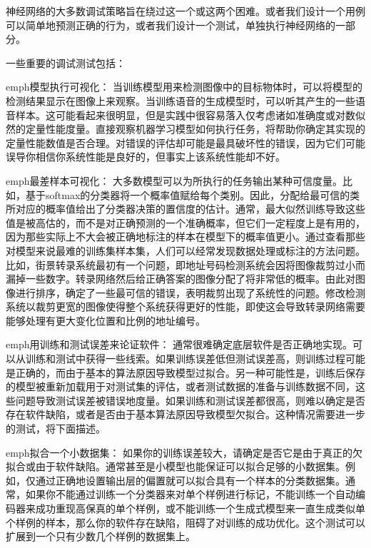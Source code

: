 神经网络的大多数调试策略旨在绕过这一个或这两个困难。或者我们设计一个用例可以简单地预测正确的行为，或者我们设计一个测试，单独执行神经网络的一部分。

一些重要的调试测试包括：

emph{模型执行可视化}：
当训练模型用来检测图像中的目标物体时，可以将模型的检测结果显示在图像上来观察。当训练语音的生成模型时，可以听其产生的一些语音样本。这可能看起来很明显，但是实践中很容易落入仅考虑诸如准确度或对数似然的定量性能度量。直接观察机器学习模型如何执行任务，将帮助你确定其实现的定量性能数值是否合理。对错误的评估却可能是最具破坏性的错误，因为它们可能误导你相信你系统性能是良好的，但事实上该系统性能却不好。

emph{最差样本可视化}：
大多数模型可以为所执行的任务输出某种可信度量。比如，基于softmax的分类器将一个概率值赋给每个类别。因此，分配给最可信的类所对应的概率值给出了分类器决策的置信度的估计。通常，最大似然训练导致这些值是被高估的，而不是对正确预测的一个准确概率，但它们一定程度上是有用的，因为那些实际上不大会被正确地标注的样本在模型下的概率值更小。通过查看那些对模型来说最难的训练集样本集，人们可以经常发现数据处理或标注的方法问题。比如，街景转录系统最初有一个问题，即地址号码检测系统会因将图像裁剪过小而漏掉一些数字。转录网络然后给正确答案的图像分配了将非常低的概率。由此对图像进行排序，确定了一些最可信的错误，表明裁剪出现了系统性的问题。修改检测系统以裁剪更宽的图像使得整个系统获得更好的性能，即使这会导致转录网络需要能够处理有更大变化位置和比例的地址编号。

emph{用训练和测试误差来论证软件}：
通常很难确定底层软件是否正确地实现。可以从训练和测试中获得一些线索。如果训练误差低但测试误差高，则训练过程可能是正确的，而由于基本的算法原因导致模型过拟合。另一种可能性是，训练后保存的模型被重新加载用于对测试集的评估，或者测试数据的准备与训练数据不同，这些问题导致测试误差被错误地度量。如果训练和测试误差都很高，则难以确定是否存在软件缺陷，或者是否由于基本算法原因导致模型欠拟合。这种情况需要进一步的测试，将下面描述。

emph{拟合一个小数据集}：
如果你的训练误差较大，请确定是否它是由于真正的欠拟合或由于软件缺陷。通常甚至是小模型也能保证可以拟合足够的小数据集。例如，仅通过正确地设置输出层的偏置就可以拟合具有一个样本的分类数据集。通常，如果你不能通过训练一个分类器来对单个样例进行标记，不能训练一个自动编码器来成功重现高保真的单个样例，或不能训练一个生成式模型来一直生成类似单个样例的样本，那么你的软件存在缺陷，阻碍了对训练的成功优化。这个测试可以扩展到一个只有少数几个样例的数据集上。

